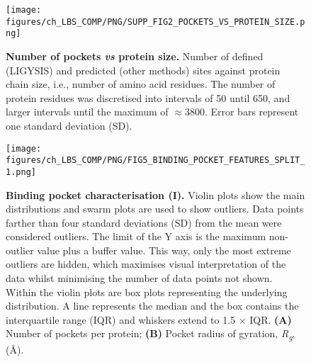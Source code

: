 \begin{figure}[ht!]
    \centering
    \texttt{[image: figures/ch\_LBS\_COMP/PNG/SUPP\_FIG2\_POCKETS\_VS\_PROTEIN\_SIZE.png]}
    \caption[Number of pockets \textit{vs} protein size]{\textbf{Number of pockets \textit{vs} protein size.} Number of defined (LIGYSIS) and predicted (other methods) sites against protein chain size, i.e., number of amino acid residues. The number of protein residues was discretised into intervals of 50 until 650, and larger intervals until the maximum of $\approx$3800. Error bars represent one standard deviation (SD).}
    \label{fig:sites_vs_prot_size}
\end{figure}

\begin{figure}[ht!]
    \centering
    \texttt{[image: figures/ch\_LBS\_COMP/PNG/FIG5\_BINDING\_POCKET\_FEATURES\_SPLIT\_1.png]}
    \caption[Binding pocket characterisation (I)]{\textbf{Binding pocket characterisation (I).} Violin plots show the main distributions and swarm plots are used to show outliers. Data points farther than four standard deviations (SD) from the mean were considered outliers. The limit of the Y axis is the maximum non-outlier value plus a buffer value. This way, only the most extreme outliers are hidden, which maximises visual interpretation of the data whilst minimising the number of data points not shown. Within the violin plots are box plots representing the underlying distribution. A line represents the median and the box contains the interquartile range (IQR) and whiskers extend to 1.5 $\times$ IQR. \textbf{(A)} Number of pockets per protein; \textbf{(B)} Pocket radius of gyration, \textit{R\textsubscript{g}}, (\AA{}).}
    \label{fig:pocket_features_1}
\end{figure}


